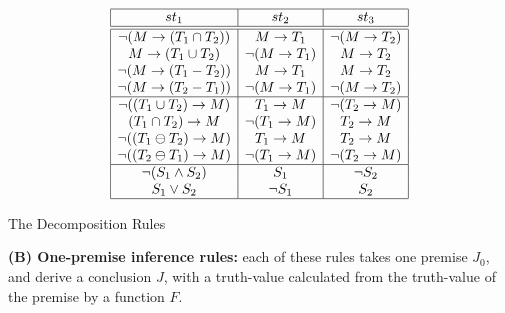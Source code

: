 \begin{description}
\begin{table}[htb]
\[\begin{array}{|c|c|c|} \hline
 st_1 & st_2 & st_3 \\
\hline \hline
\neg (M \rightarrow (T_1 \cap T_2)) & M \rightarrow T_1 & \neg (M \rightarrow T_2) \\
M \rightarrow (T_1 \cup T_2) & \neg (M \rightarrow T_1) & M \rightarrow T_2 \\
\neg (M \rightarrow (T_1 - T_2)) & M \rightarrow T_1 & M \rightarrow T_2 \\
\neg (M \rightarrow (T_2 - T_1)) & \neg (M \rightarrow T_1) & \neg (M \rightarrow T_2) \\
\hline
\neg ((T_1 \cup T_2) \rightarrow M) & T_1 \rightarrow M & \neg (T_2 \rightarrow M) \\
(T_1 \cap T_2) \rightarrow M & \neg(T_1 \rightarrow M) & T_2 \rightarrow M \\
\neg ((T_1 \ominus T_2) \rightarrow M) & T_1 \rightarrow M & T_2 \rightarrow M \\
\neg ((T_2 \ominus T_1) \rightarrow M) & \neg (T_1 \rightarrow M) & \neg (T_2 \rightarrow M) \\
\hline
\neg (S_1 \wedge S_2) & S_1 & \neg S_2 \\
S_1 \vee S_2 & \neg S_1 & S_2 \\
\hline \end{array}\]
\caption{The Decomposition Rules}
\label{Decomposition}
\end{table}

\end{description}

\textbf{(B) One-premise inference rules:} each of these rules takes one premise $J_0$, and derive a conclusion $J$, with a truth-value calculated from the truth-value of the premise by a function $F$.

